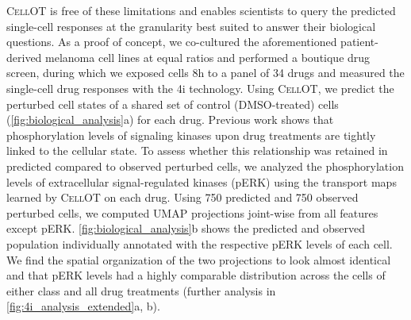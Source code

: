 \textsc{CellOT} is free of these limitations and enables scientists to query the predicted single-cell responses at the granularity best suited to answer their biological questions. As a proof of concept, we co-cultured the aforementioned patient-derived melanoma cell lines at equal ratios and performed a boutique drug screen, during which we exposed cells 8h to a panel of 34 drugs and measured the single-cell drug responses with the 4i technology. 
Using \textsc{CellOT}, 
we predict the perturbed cell states of a shared set of control (DMSO-treated) cells (\cref{fig:biological_analysis}a) for each drug.
Previous work \citep{kramer2019cellular} shows that phosphorylation levels of signaling kinases upon drug treatments are tightly linked to the cellular state. 
To assess whether this relationship was retained in predicted compared to observed perturbed cells, we analyzed the phosphorylation levels of extracellular signal-regulated kinases (pERK) using the transport maps learned by \textsc{CellOT} on each drug.
Using 750 predicted and 750 observed perturbed cells, we computed \acrshort{UMAP} projections joint-wise from all features except pERK. \cref{fig:biological_analysis}b shows the predicted and observed population individually annotated with the respective pERK levels of each cell. We find the spatial organization of the two projections to look almost identical and that pERK levels had a highly comparable distribution across the cells of either class and all drug treatments (further analysis in \cref{fig:4i_analysis_extended}a, b).




